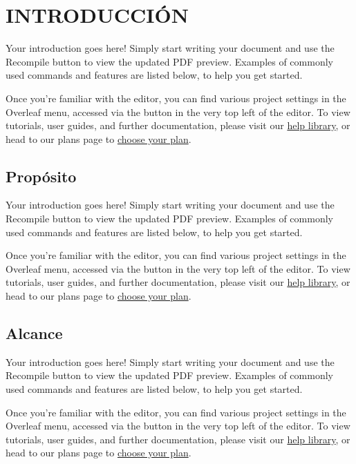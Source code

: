 \documentclass {article}
\begin{document}
\section{INTRODUCCIÓN}
Your introduction goes here! Simply start writing your document and use the Recompile button to view the updated PDF preview. Examples of commonly used commands and features are listed below, to help you get started.

Once you're familiar with the editor, you can find various project settings in the Overleaf menu, accessed via the button in the very top left of the editor. To view tutorials, user guides, and further documentation, please visit our \href{https://www.overleaf.com/learn}{help library}, or head to our plans page to \href{https://www.overleaf.com/user/subscription/plans}{choose your plan}.
\subsection{Propósito}
Your introduction goes here! Simply start writing your document and use the Recompile button to view the updated PDF preview. Examples of commonly used commands and features are listed below, to help you get started.

Once you're familiar with the editor, you can find various project settings in the Overleaf menu, accessed via the button in the very top left of the editor. To view tutorials, user guides, and further documentation, please visit our \href{https://www.overleaf.com/learn}{help library}, or head to our plans page to \href{https://www.overleaf.com/user/subscription/plans}{choose your plan}.
\subsection{Alcance}
Your introduction goes here! Simply start writing your document and use the Recompile button to view the updated PDF preview. Examples of commonly used commands and features are listed below, to help you get started.

Once you're familiar with the editor, you can find various project settings in the Overleaf menu, accessed via the button in the very top left of the editor. To view tutorials, user guides, and further documentation, please visit our \href{https://www.overleaf.com/learn}{help library}, or head to our plans page to \href{https://www.overleaf.com/user/subscription/plans}{choose your plan}.
\end{document}
